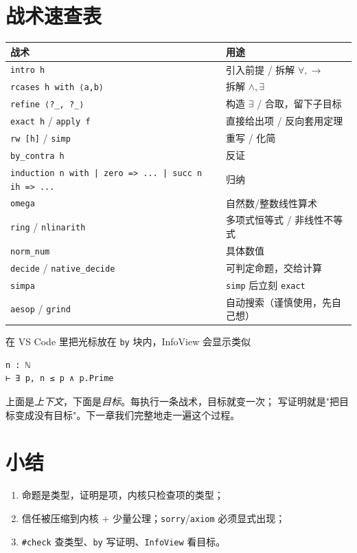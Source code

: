 \section{战术速查表}
\label{sec:06-tactics}

\begin{center}\small
\begin{tabular}{@{}p{}p{}@{}}
\toprule
\textbf{战术} & \textbf{用途}\\
\midrule
\texttt{intro h} & 引入前提 / 拆解 $\forall,\to$\\
\texttt{rcases h with ⟨a,b⟩} & 拆解 $\land,\exists$\\
\texttt{refine ⟨?\_, ?\_⟩} & 构造 $\exists$ / 合取，留下子目标\\
\texttt{exact h} / \texttt{apply f} & 直接给出项 / 反向套用定理\\
\texttt{rw [h]} / \texttt{simp} & 重写 / 化简\\
\texttt{by\_contra h} & 反证\\
\texttt{induction n with | zero => ... | succ n ih => ...} & 归纳\\
\texttt{omega} & 自然数/整数线性算术\\
\texttt{ring} / \texttt{nlinarith} & 多项式恒等式 / 非线性不等式\\
\texttt{norm\_num} & 具体数值\\
\texttt{decide} / \texttt{native\_decide} & 可判定命题，交给计算\\
\texttt{simpa} & \texttt{simp} 后立刻 \texttt{exact}\\
\texttt{aesop} / \texttt{grind} & 自动搜索（谨慎使用，先自己想）\\
\bottomrule
\end{tabular}
\end{center}

\begin{remark}
在 VS Code 里把光标放在 \texttt{by} 块内，InfoView 会显示类似
\begin{lstlisting}[language=Lean,numbers=none,frame=none,xleftmargin=0pt]
n : ℕ
⊢ ∃ p, n ≤ p ∧ p.Prime
\end{lstlisting}
上面是\emph{上下文}，下面是\emph{目标}。每执行一条战术，目标就变一次；
写证明就是"把目标变成没有目标"。下一章我们完整地走一遍这个过程。
\end{remark}

\section{小结}
\label{sec:06-summary}

\begin{enumerate}[label=\arabic*.]
  \item 命题是类型，证明是项，内核只检查项的类型；
  \item 信任被压缩到内核 + 少量公理；\texttt{sorry}/\texttt{axiom} 必须显式出现；
  \item \texttt{\#check} 查类型、\texttt{by} 写证明、\texttt{InfoView} 看目标。
\end{enumerate}
